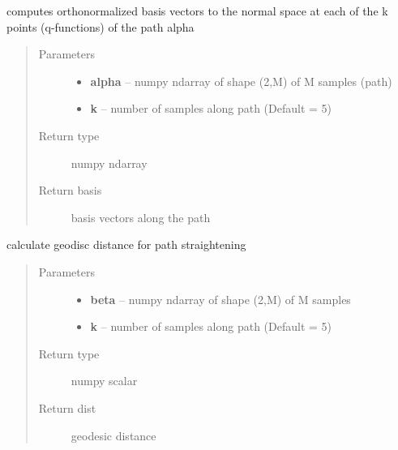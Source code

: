 \documentclass[letterpaper,10pt,english]{sphinxmanual}
\begin{document}
\begin{fulllineitems}
\label{geodesic:geodesic.find_basis_normal_path}
computes orthonormalized basis vectors to the normal space at each of the
k points (q-functions) of the path alpha
\begin{quote}\begin{description}
\item[{Parameters}] \leavevmode\begin{itemize}
\item {} 
\textbf{alpha} -- numpy ndarray of shape (2,M) of M samples (path)

\item {} 
\textbf{k} -- number of samples along path (Default = 5)

\end{itemize}

\item[{Return type}] \leavevmode
numpy ndarray

\item[{Return basis}] \leavevmode
basis vectors along the path

\end{description}\end{quote}

\end{fulllineitems}


\begin{fulllineitems}
\label{geodesic:geodesic.geod_dist_path_strt}
calculate geodisc distance for path straightening
\begin{quote}\begin{description}
\item[{Parameters}] \leavevmode\begin{itemize}
\item {} 
\textbf{beta} -- numpy ndarray of shape (2,M) of M samples

\item {} 
\textbf{k} -- number of samples along path (Default = 5)

\end{itemize}

\item[{Return type}] \leavevmode
numpy scalar

\item[{Return dist}] \leavevmode
geodesic distance

\end{description}\end{quote}

\end{fulllineitems}
\end{document}
